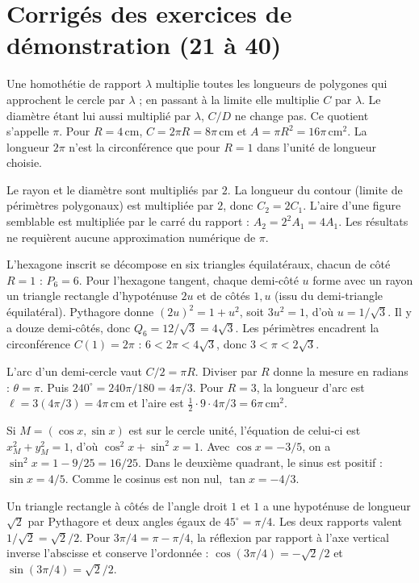 \chapter{Corrigés des exercices de démonstration (21 à 40)}
Une homothétie de rapport $\lambda$ multiplie toutes les longueurs de polygones qui approchent le cercle par $\lambda$ ; en passant à la limite elle multiplie $C$ par $\lambda$. Le diamètre étant lui aussi multiplié par $\lambda$, $C/D$ ne change pas. Ce quotient s'appelle $\pi$. Pour $R=4\,\mathrm{cm}$, $C=2\pi R=\boxed{8\pi\,\mathrm{cm}}$ et $A=\pi R^2=\boxed{16\pi\,\mathrm{cm}^2}$. La longueur $2\pi$ n'est la circonférence que pour $R=1$ dans l'unité de longueur choisie.

Le rayon et le diamètre sont multipliés par $2$. La longueur du contour (limite de périmètres polygonaux) est multipliée par $2$, donc $C_2=2C_1$. L'aire d'une figure semblable est multipliée par le carré du rapport : $A_2=2^2A_1=4A_1$. Les résultats ne requièrent aucune approximation numérique de $\pi$.

L'hexagone inscrit se décompose en six triangles équilatéraux, chacun de côté $R=1$ : $P_6=6$. Pour l'hexagone tangent, chaque demi-côté $u$ forme avec un rayon un triangle rectangle d'hypoténuse $2u$ et de côtés $1,u$ (issu du demi-triangle équilatéral). Pythagore donne $(2u)^2=1+u^2$, soit $3u^2=1$, d'où $u=1/\sqrt3$. Il y a douze demi-côtés, donc $Q_6=12/\sqrt3=4\sqrt3$. Les périmètres encadrent la circonférence $C(1)=2\pi$ : $6<2\pi<4\sqrt3$, donc $\boxed{3<\pi<2\sqrt3}$.

L'arc d'un demi-cercle vaut $C/2=\pi R$. Diviser par $R$ donne la mesure en radians : $\theta=\pi$. Puis $240^\circ=240\pi/180=4\pi/3$. Pour $R=3$, la longueur d'arc est $\ell=3(4\pi/3)=\boxed{4\pi\,\mathrm{cm}}$ et l'aire est $\frac12\cdot9\cdot4\pi/3=\boxed{6\pi\,\mathrm{cm}^2}$.

Si $M=(\cos x,\sin x)$ est sur le cercle unité, l'équation de celui-ci est $x_M^2+y_M^2=1$, d'où $\cos^2x+\sin^2x=1$. Avec $\cos x=-3/5$, on a $\sin^2x=1-9/25=16/25$. Dans le deuxième quadrant, le sinus est positif : $\boxed{\sin x=4/5}$. Comme le cosinus est non nul, $\boxed{\tan x=-4/3}$.

Un triangle rectangle à côtés de l'angle droit $1$ et $1$ a une hypoténuse de longueur $\sqrt2$ par Pythagore et deux angles égaux de $45^\circ=\pi/4$. Les deux rapports valent $1/\sqrt2=\sqrt2/2$. Pour $3\pi/4=\pi-\pi/4$, la réflexion par rapport à l'axe vertical inverse l'abscisse et conserve l'ordonnée : $\boxed{\cos(3\pi/4)=-\sqrt2/2}$ et $\boxed{\sin(3\pi/4)=\sqrt2/2}$.

